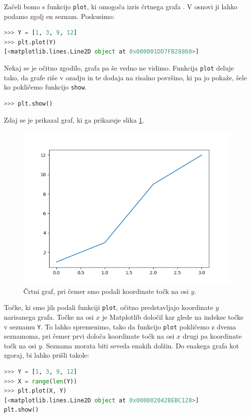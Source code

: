 Začeli bomo s funkcijo \texttt{plot}, ki omogoča izris črtnega grafa . V osnovi ji lahko podamo zgolj en seznam. Poskusimo:
\begin{lstlisting}[language=Python]
>>> Y = [1, 3, 9, 12]
>>> plt.plot(Y)
[<matplotlib.lines.Line2D object at 0x000001DD7FB28860>]
\end{lstlisting}
Nekaj se je očitno zgodilo, grafa pa še vedno ne vidimo. Funkcija \texttt{plot} deluje tako, da grafe riše v ozadju in te dodaja na risalno površino, ki pa jo pokaže, šele ko pokličemo funkcijo \texttt{show}.
\begin{lstlisting}[language=Python, showstringspaces=false]
>>> plt.show()
\end{lstlisting}
Zdaj se je prikazal graf, ki ga prikazuje slika \ref{img:plt1}.
\begin{figure}
    \includegraphics[width=\linewidth]{img/plt1.png}
    \caption{Črtni graf, pri čemer smo podali koordinate točk na osi $y$.}
    \label{img:plt1}
\end{figure}
Točke, ki smo jih podali funkciji \texttt{plot}, očitno predstavljajo koordinate $y$ narisanega grafa. Točke na osi $x$ je Matplotlib določil kar glede na indekse točke v seznamu \texttt{Y}. To lahko spremenimo, tako da funkcijo \texttt{plot} pokličemo z dvema seznamoma, pri čemer prvi določa koordinate točk na osi $x$ drugi pa koordinate točk na osi $y$. Seznama morata biti seveda enakih dolžin. Do enakega grafa kot zgoraj, bi lahko prišli takole: 
\begin{lstlisting}[language=Python, showstringspaces=false]
>>> Y = [1, 3, 9, 12]
>>> X = range(len(Y))
>>> plt.plot(X, Y)
[<matplotlib.lines.Line2D object at 0x000002042BEBC128>]
plt.show()
\end{lstlisting}
